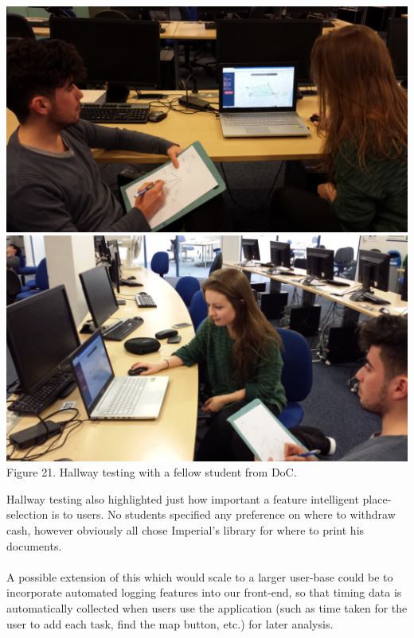 \documentclass[a4paper, 10pt]{report}
\begin{document}
\begin{center}
\includegraphics[scale=0.2]{hallway_1.png}
\includegraphics[scale=0.2]{hallway_2.png} \\
Figure 21. Hallway testing with a fellow student from DoC.
\end{center}
Hallway testing also highlighted just how important a feature intelligent place-selection is to users. No students specified any preference on where to withdraw cash, however obviously all chose Imperial's library for where to print his documents.\\
\\
A possible extension of this which would scale to a larger user-base could be to incorporate automated logging features into our front-end, so that timing data is automatically collected when users use the application (such as time taken for the user to add each task, find the map button, etc.) for later analysis.
\end{document}
